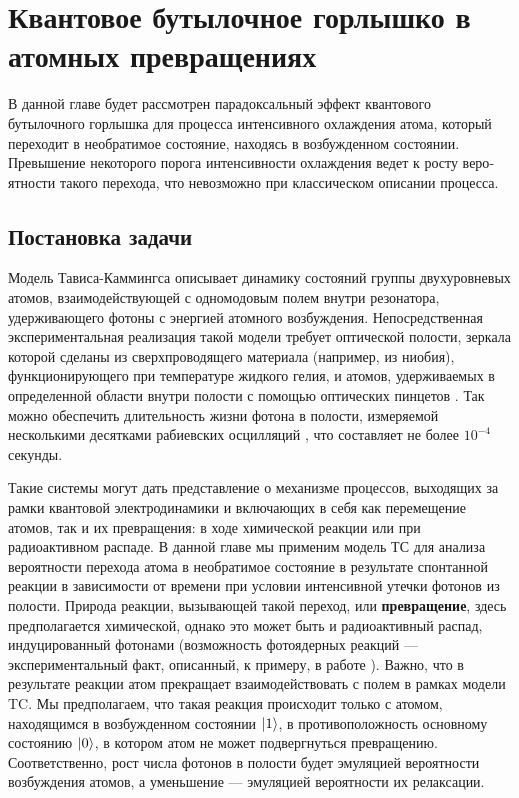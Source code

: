 \chapter{Квантовое бутылочное горлышко в атомных превращениях}\label{ch:ch2}

В данной главе будет рассмотрен парадоксальный эффект квантового бутылочного горлышка для процесса интенсивного охлаждения атома, кото­рый переходит в необратимое состояние, находясь в возбужденном состоянии. Превышение некоторого порога интенсивности охлаждения ведет к росту веро­ятности такого перехода, что невозможно при классическом описании процесса.

\section{Постановка задачи}\label{sec:ch2/sec1}
Модель Тависа-Каммингса \cite{tc_exact_solution,tc_a_study,tc_dicke_2,tc_improvement,tc_experimental} описывает динамику состояний группы двухуровневых атомов, взаимодействующей с одномодовым полем внутри резонатора, удерживающего фотоны с энергией атомного возбуждения. Непосредственная экспериментальная реализация такой модели требует оптической полости, зеркала которой сделаны из сверхпроводящего материала (например, из ниобия), функционирующего при температуре жидкого гелия, и атомов, удерживаемых в определенной области внутри полости с помощью оптических пинцетов \cite{cavity_exp_1,cavity_exp_2,cavity_exp_3}. Так можно обеспечить длительность жизни фотона в полости, измеряемой несколькими десятками рабиевских осцилляций \cite{rabi_1,rabi_2,rabi_3}, что составляет не более $10^{-4}$ секунды.

Такие системы могут дать представление о механизме процессов, выходящих за рамки квантовой электродинамики и включающих в себя как перемещение атомов, так и их превращения: в ходе химической реакции или при радиоактивном распаде. В данной главе мы применим модель ТС для анализа вероятности перехода атома в необратимое состояние в результате спонтанной реакции в зависимости от времени при условии интенсивной утечки фотонов из полости. Природа ре­акции, вызывающей такой переход, или \textbf{превращение}, здесь предполагается химической, однако это может быть и радиоактивный распад, индуцированный фотонами (возможность фотоядерных реакций --- экспериментальный факт, описанный, к примеру, в работе \cite{photonuclear_reactions}). Важно, что в результате реакции атом прекращает взаимодействовать с полем в рамках модели TC. Мы предполагаем, что такая реакция происходит только с атомом, находящимся в возбужденном состоянии  $|1\rangle$, в противоположность основному состоянию $|0\rangle$, в котором атом не может подвергнуться превращению. Соответственно, рост числа фотонов в полости будет эмуляцией вероятности возбуждения атомов, а уменьшение --- эмуляцией вероятности их релаксации.

